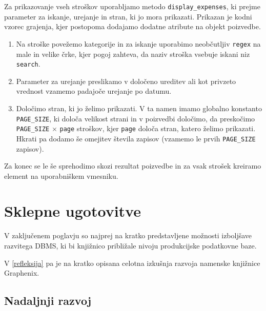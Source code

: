 \documentclass[a4paper,12pt,openright]{book}
\begin{document}
    \noindent
    Za prikazovanje vseh stroškov uporabljamo metodo {\tt display\_expenses}, ki prejme parameter za iskanje, urejanje in stran, ki jo mora prikazati. Prikazan je kodni vzorec grajenja, kjer postopoma dodajamo dodatne atribute na objekt poizvedbe. 
    \begin{enumerate}
        \item Na stroške povežemo kategorije in za iskanje uporabimo neobčutljiv {\tt regex} na male in velike črke, kjer pogoj zahteva, da naziv stroška vsebuje iskani niz {\tt search}.
        \item Parameter za urejanje preslikamo v določeno ureditev ali kot privzeto vrednost vzamemo padajoče urejanje po datumu.
        \item Določimo stran, ki jo želimo prikazati. V ta namen imamo globalno konstanto {\tt PAGE\_SIZE}, ki določa velikost strani in v poizvedbi določimo, da preskočimo {\tt PAGE\_SIZE} $\times$ {\tt page} stroškov, kjer {\tt page} določa stran, katero želimo prikazati. Hkrati pa dodamo še omejitev števila zapisov (vzamemo le prvih {\tt PAGE\_SIZE} zapisov).
    \end{enumerate}

    \noindent
    Za konec se le še sprehodimo skozi rezultat poizvedbe in za vsak strošek kreiramo element na uporabniškem vmesniku.
    

\chapter{Sklepne ugotovitve}
    
    V zaključenem poglavju so najprej na kratko predstavljene možnosti izboljšave razvitega DBMS, ki bi knjižnico približale nivoju produkcijske podatkovne baze.

    V \ref{refleksija} pa je na kratko opisana celotna izkušnja razvoja namenske knjižnice Graphenix.
    
    \section{Nadaljnji razvoj}
\end{document}
